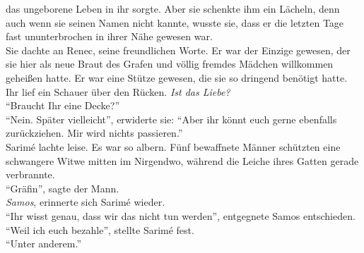 das ungeborene Leben in ihr sorgte. Aber sie schenkte ihm ein Lächeln, denn auch wenn sie seinen 
Namen nicht kannte, wusste sie, dass er die letzten Tage fast ununterbrochen in ihrer Nähe gewesen 
war. \\
Sie dachte an Renec, seine freundlichen Worte. Er war der Einzige gewesen, der sie hier als neue 
Braut des Grafen und völlig fremdes Mädchen willkommen geheißen hatte. Er war eine Stütze gewesen, 
die sie so dringend benötigt hatte. Ihr lief ein Schauer über den Rücken. \textit{Ist das Liebe?}\\
``Braucht Ihr eine Decke?''\\
``Nein. Später vielleicht'', erwiderte sie: ``Aber ihr könnt euch gerne ebenfalls zurückziehen. Mir 
wird nichts passieren.'' \\ 
Sarimé lachte leise. Es war so albern. Fünf bewaffnete Männer schützten eine schwangere Witwe 
mitten im Nirgendwo, während die Leiche ihres Gatten gerade verbrannte.\\
``Gräfin'', sagte der Mann.\\
\textit{Samos}, erinnerte sich Sarimé wieder.\\
``Ihr wisst genau, dass wir das nicht tun werden'', entgegnete Samos entschieden.\\
``Weil ich euch bezahle'', stellte Sarimé fest.\\
``Unter anderem.''\\


